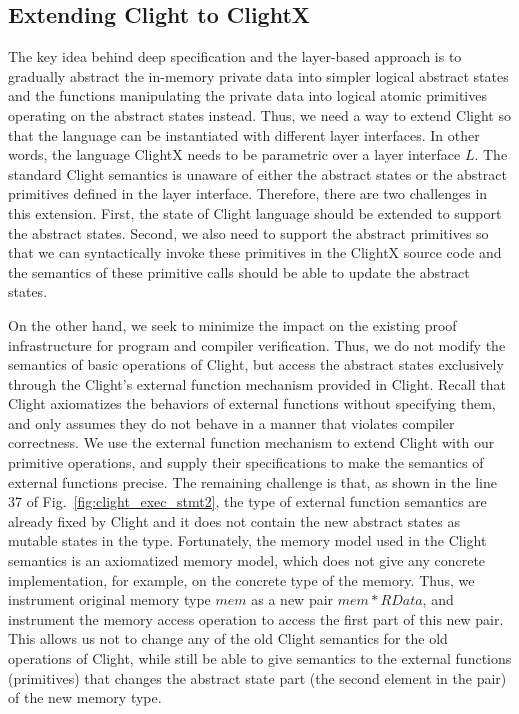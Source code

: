 \subsection{Extending Clight to ClightX}

The key idea behind deep specification and the layer-based approach
is to gradually abstract the in-memory private data into simpler logical
abstract states and the functions manipulating the private data
into logical atomic primitives operating on the abstract states instead.
Thus, we need a way to extend Clight so that the language can be instantiated
with different layer interfaces. In other words, the language ClightX
needs to be parametric over a layer interface $L$. 
The standard Clight semantics is unaware of either the
abstract states or the abstract primitives defined in the layer
interface. Therefore, there are two challenges
in this extension. First, the state of Clight language should be extended
to support the abstract states. Second, we also need to support
the abstract primitives so that we can syntactically invoke these primitives
in the ClightX source code and the semantics of these primitive calls
should be able to update the abstract states.

On the other hand, we seek to minimize the impact on the existing proof
infrastructure for program and compiler verification. Thus, we do not
modify the semantics of basic operations of Clight, but access the
abstract states exclusively through the Clight's external function
mechanism provided in Clight. Recall that
Clight axiomatizes the behaviors of external functions without
specifying them, and only assumes they do not behave in a manner that
violates compiler correctness. We use the external function mechanism
to extend Clight with our primitive operations, and supply their
specifications to make the semantics of external functions precise. 
The remaining challenge is that, as shown in the line 37 of
Fig.~\ref{fig:clight_exec_stmt2}, the type of external function semantics
are already fixed by Clight and it does not contain the new abstract states
as mutable states in the type. Fortunately, the memory model used in
the Clight semantics is an axiomatized memory model, which does not
give any concrete implementation, for example, on the concrete type
of the memory. Thus, we instrument original memory type $mem$ as a
new pair $mem * RData$, and instrument the memory access operation
to access the first part of this new pair. This allows us not to change
any of the old Clight semantics for the old operations of Clight,
while still be able to give semantics to the external functions (primitives)
that changes the abstract state part (the second element in the pair)
of the new memory type.

